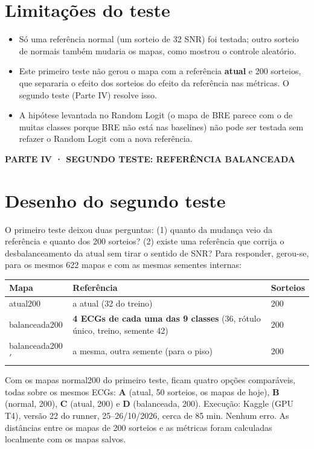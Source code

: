 \documentclass[11pt,a4paper]{article}
\newcommand{\partbar}[1]{\par\vspace{1.2em}\noindent\colorbox{black!80}{\parbox{\dimexpr\linewidth-2\fboxsep}{\color{white}\bfseries\sffamily\MakeUppercase{#1}}}\par\vspace{0.4em}}
\begin{document}
\section{Limitações do teste}
\begin{itemize}
\item Só uma referência normal (um sorteio de 32 SNR) foi testada; outro sorteio de normais também mudaria os mapas, como mostrou o controle aleatório.
\item Este primeiro teste não gerou o mapa com a referência \textbf{atual} e 200 sorteios, que separaria o efeito dos sorteios do efeito da referência nas métricas. O segundo teste (Parte IV) resolve isso.
\item A hipótese levantada no Random Logit (o mapa de BRE parece com o de muitas classes porque BRE não está nas baselines) não pode ser testada sem refazer o Random Logit com a nova referência.
\end{itemize}

\partbar{Parte IV · Segundo teste: referência balanceada}

\section{Desenho do segundo teste}
O primeiro teste deixou duas perguntas: (1) quanto da mudança veio da referência e quanto dos 200 sorteios? (2) existe uma referência que corrija o desbalanceamento da atual sem tirar o sentido de SNR? Para responder, gerou-se, para os mesmos 622 mapas e com as mesmas sementes internas:
\begin{center}\small
\begin{tabularx}{\linewidth}{lXl}
\toprule
\textbf{Mapa} & \textbf{Referência} & \textbf{Sorteios} \\
\midrule
atual200 & a atual (32 do treino) & 200 \\
balanceada200 & \textbf{4 ECGs de cada uma das 9 classes} (36, rótulo único, treino, semente 42) & 200 \\
balanceada200$'$ & a mesma, outra semente (para o piso) & 200 \\
\bottomrule
\end{tabularx}
\end{center}
Com os mapas normal200 do primeiro teste, ficam quatro opções comparáveis, todas sobre os mesmos ECGs: \textbf{A} (atual, 50 sorteios, os mapas de hoje), \textbf{B} (normal, 200), \textbf{C} (atual, 200) e \textbf{D} (balanceada, 200). Execução: Kaggle (GPU T4), versão 22 do runner, 25--26/10/2026, cerca de 85 min. Nenhum erro. As distâncias entre os mapas de 200 sorteios e as métricas foram calculadas localmente com os mapas salvos.
\end{document}
